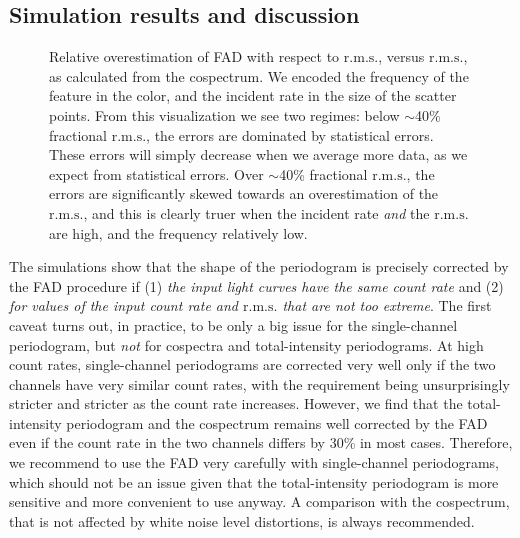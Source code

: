 \documentclass[twocolumn]{aastex61}
\newcommand{\rms}{\ensuremath{\mathrm{r.m.s.}}\xspace}
\begin{document}
\subsection{Simulation results and discussion}\label{sec:caveat}
\begin{figure*}
    \caption{Relative overestimation of FAD with respect to \rms, versus \rms, as calculated from the cospectrum.  
    We encoded the frequency of the feature in the color, and the incident rate in the size of the scatter points.
    From this visualization we see two regimes: below $\sim$40\% fractional \rms, the errors are dominated by statistical errors. 
    These errors will simply decrease when we average more data, as we expect from statistical errors.
    Over $\sim$40\% fractional \rms, the errors are significantly skewed towards an overestimation of the \rms, and this is 
    clearly truer when the incident rate \textit{and} the \rms are high, and the frequency relatively low.}
    \label{fig:errors}
\end{figure*}

The simulations show that the shape of the periodogram is precisely corrected by the FAD procedure if (1) \textit{the input light curves have the same count rate} and (2) \textit{for values of the input count rate and \rms that are not too extreme}. 
The first caveat turns out, in practice, to be only a big issue for the single-channel periodogram, but \textit{not} for cospectra and total-intensity periodograms. 
At high count rates, single-channel periodograms are corrected very well only if the two channels have very similar count rates, with the requirement being unsurprisingly stricter and stricter as the count rate increases.
However, we find that the total-intensity periodogram and the cospectrum remains well corrected by the FAD even if the count rate in the two channels differs by 30\% in most cases.
Therefore, we recommend to use the FAD very carefully with single-channel periodograms, which should not be an issue given that the total-intensity periodogram is more sensitive and more convenient to use anyway. 
A comparison with the cospectrum, that is not affected by white noise level distortions, is always recommended. 
\end{document}
